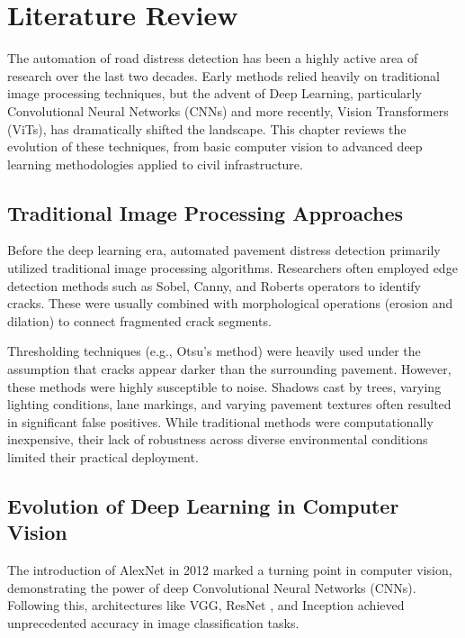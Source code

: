 \chapter{Literature Review}
\label{chap:literature_review}

The automation of road distress detection has been a highly active area of research over the last two decades. Early methods relied heavily on traditional image processing techniques, but the advent of Deep Learning, particularly Convolutional Neural Networks (CNNs) and more recently, Vision Transformers (ViTs), has dramatically shifted the landscape. This chapter reviews the evolution of these techniques, from basic computer vision to advanced deep learning methodologies applied to civil infrastructure.

\section{Traditional Image Processing Approaches}
Before the deep learning era, automated pavement distress detection primarily utilized traditional image processing algorithms. Researchers often employed edge detection methods such as Sobel, Canny, and Roberts operators to identify cracks. These were usually combined with morphological operations (erosion and dilation) to connect fragmented crack segments.

Thresholding techniques (e.g., Otsu's method) were heavily used under the assumption that cracks appear darker than the surrounding pavement. However, these methods were highly susceptible to noise. Shadows cast by trees, varying lighting conditions, lane markings, and varying pavement textures often resulted in significant false positives. While traditional methods were computationally inexpensive, their lack of robustness across diverse environmental conditions limited their practical deployment.

\section{Evolution of Deep Learning in Computer Vision}
The introduction of AlexNet in 2012 marked a turning point in computer vision, demonstrating the power of deep Convolutional Neural Networks (CNNs). Following this, architectures like VGG, ResNet \cite{he2016deep}, and Inception achieved unprecedented accuracy in image classification tasks.

